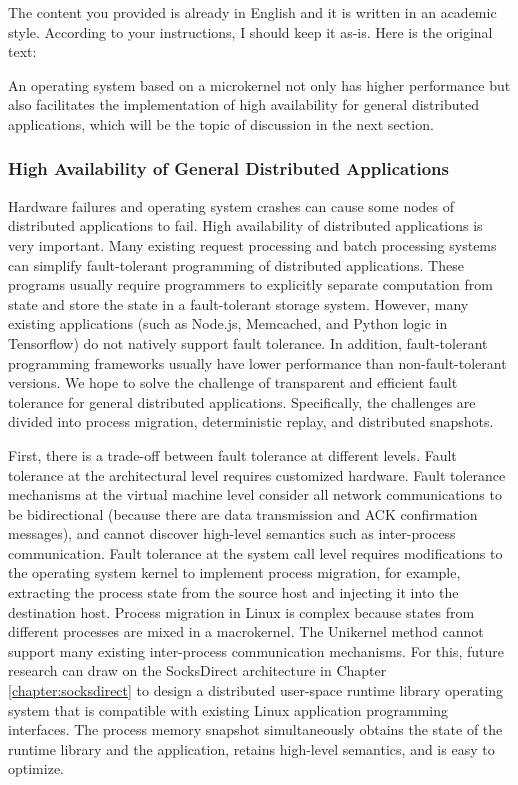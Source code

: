 The content you provided is already in English and it is written in an academic style. According to your instructions, I should keep it as-is. Here is the original text:

An operating system based on a microkernel not only has higher performance but also facilitates the implementation of high availability for general distributed applications, which will be the topic of discussion in the next section.

\subsubsection{High Availability of General Distributed Applications}
\label{future:ftlinux}

Hardware failures and operating system crashes can cause some nodes of distributed applications to fail.
High availability of distributed applications is very important.
Many existing request processing and batch processing systems can simplify fault-tolerant programming of distributed applications.
These programs usually require programmers to explicitly separate computation from state and store the state in a fault-tolerant storage system.
However, many existing applications (such as Node.js, Memcached, and Python logic in Tensorflow) do not natively support fault tolerance. In addition, fault-tolerant programming frameworks usually have lower performance than non-fault-tolerant versions.
We hope to solve the challenge of transparent and efficient fault tolerance for general distributed applications.
Specifically, the challenges are divided into process migration, deterministic replay, and distributed snapshots.

First, there is a trade-off between fault tolerance at different levels.
Fault tolerance at the architectural level requires customized hardware.
Fault tolerance mechanisms at the virtual machine level consider all network communications to be bidirectional (because there are data transmission and ACK confirmation messages), and cannot discover high-level semantics such as inter-process communication.
Fault tolerance at the system call level requires modifications to the operating system kernel to implement process migration, for example, extracting the process state from the source host and injecting it into the destination host.
Process migration in Linux is complex because states from different processes are mixed in a macrokernel.
The Unikernel method cannot support many existing inter-process communication mechanisms.
For this, future research can draw on the SocksDirect architecture in Chapter \ref{chapter:socksdirect} to design a distributed user-space runtime library operating system that is compatible with existing Linux application programming interfaces.
The process memory snapshot simultaneously obtains the state of the runtime library and the application, retains high-level semantics, and is easy to optimize.

